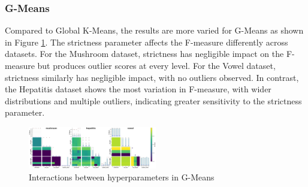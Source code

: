 \subsubsection{G-Means}
\label{subsec:gmeansresults}

Compared to Global K-Means, the results are more varied for G-Means as shown in Figure \ref{fig:interactions_gmeans}.
The strictness parameter affects the F-measure differently across datasets. For the Mushroom dataset, strictness has
negligible impact on the F-measure but produces outlier scores at every level. For the Vowel dataset, strictness similarly
has negligible impact, with no outliers observed. In contrast, the Hepatitis dataset shows the most variation in F-measure,
with wider distributions and multiple outliers, indicating greater sensitivity to the strictness parameter.



\begin{figure}[h!]
    \centering
    \includegraphics[width=0.5\textwidth]{figures/interactions_gmeans.png}
    \caption{Interactions between hyperparameters in G-Means}
    \label{fig:interactions_gmeans}
\end{figure}



